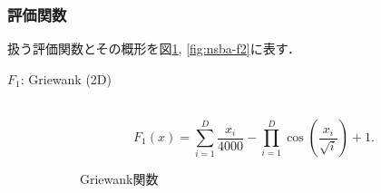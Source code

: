 \documentclass[a4j,11pt]{jarticle}
\begin{document}
\subsubsection{評価関数}
\label{sss:NSBA-func}
扱う評価関数とその概形を図\ref{fig:nsba-f1}, \ref{fig:nsba-f2}に表す．

\begin{description}
\item[$F_1$: Griewank (2D)]\mbox{}\\
\begin{equation}
\label{eq:nsba-F1}
F_1(x)=\sum_{i=1}^D \frac{x_i}{4000}- \prod_{i=1}^D \cos(\frac{x_i}{\sqrt{i}})+1.
\end{equation}

\begin{figure}[t]
\centering
{}
\caption{Griewank関数}
\label{fig:nsba-f1}
\end{figure}


\end{description}
\end{document}
